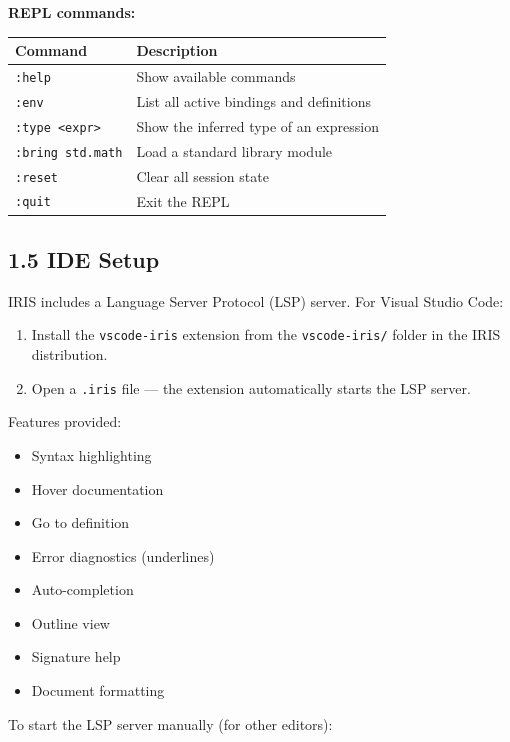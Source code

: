 \documentclass[
  english,
]{book}
\providecommand{\tightlist}{%
  \setlength{\itemsep}{0pt}\setlength{\parskip}{0pt}}
\begin{document}
\textbf{REPL commands:}

\begin{longtable}[]{@{}ll@{}}
\toprule\noalign{}
Command & Description \\
\midrule\noalign{}
\endhead
\bottomrule\noalign{}
\endlastfoot
\texttt{:help} & Show available commands \\
\texttt{:env} & List all active bindings and definitions \\
\texttt{:type\ \textless{}expr\textgreater{}} & Show the inferred type
of an expression \\
\texttt{:bring\ std.math} & Load a standard library module \\
\texttt{:reset} & Clear all session state \\
\texttt{:quit} & Exit the REPL \\
\end{longtable}

\subsection{1.5 IDE Setup}\label{ide-setup}

IRIS includes a Language Server Protocol (LSP) server. For Visual Studio
Code:

\begin{enumerate}
\def\labelenumi{\arabic{enumi}.}
\tightlist
\item
  Install the \texttt{vscode-iris} extension from the
  \texttt{vscode-iris/} folder in the IRIS distribution.
\item
  Open a \texttt{.iris} file --- the extension automatically starts the
  LSP server.
\end{enumerate}

Features provided:

\begin{itemize}
\tightlist
\item
  Syntax highlighting
\item
  Hover documentation
\item
  Go to definition
\item
  Error diagnostics (underlines)
\item
  Auto-completion
\item
  Outline view
\item
  Signature help
\item
  Document formatting
\end{itemize}

To start the LSP server manually (for other editors):
\end{document}
